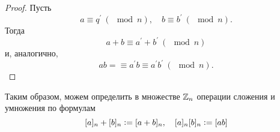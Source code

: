 \begin{proof}
    Пусть
    $$
    a \equiv q^\prime\ (\mod n),\quad b \equiv b^\prime\ (\mod n).
    $$
    Тогда
    $$
    a + b \equiv a^\prime + b^\prime\ (\mod n)
    $$
    и, аналогично,
    $$
    ab = \equiv a^\prime b \equiv a^\prime b^\prime\ (\mod n).
    $$
\end{proof}

\begin{definition}
    Таким образом, можем определить в множестве $\mathbb{Z}_n$ операции сложения и умножения по формулам
    $$
    [a]_n + [b]_n \vcentcolon= [a + b]_n,\quad [a]_n[b]_n \vcentcolon= [ab]
    $$
\end{definition}


